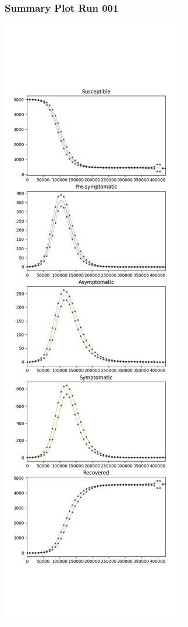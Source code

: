 \documentclass{article}
\begin{document}
\subsubsection{Summary Plot Run 001}
\includegraphics[scale=0.4]{plot_summary_run_001.png}
\end{document}
